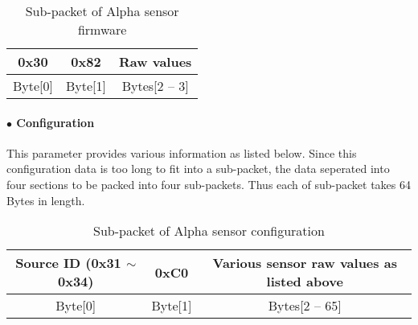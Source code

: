 \begin{table}[h!]
    \centering
    \caption{Sub-packet of Alpha sensor firmware}
    \begin{tabular}{|c|c|c|}
        \hline
        \rowcolor{black!8}
        \textbf{0x30} & \textbf{0x82} & \textbf{Raw values}\\
        \hline
        Byte[0] & Byte[1] & Bytes[2 -- 3] \\ \hline
    \end{tabular}
\end{table}


\paragraph{$\bullet$ Configuration}
This parameter provides various information as listed below.
Since this configuration data is too long to fit into a sub-packet, the data seperated into four sections to be packed into four sub-packets. Thus each of sub-packet takes 64 Bytes in length.


\begin{table}[h!]
    \centering
    \caption{Sub-packet of Alpha sensor configuration}
    \begin{tabular}{|c|c|c|}
        \hline
        \rowcolor{black!8}
        \textbf{Source ID} (0x31 $\sim$ 0x34) & \textbf{0xC0} & \textbf{Various sensor raw values as listed above}\\
        \hline
        Byte[0] & Byte[1] & Bytes[2 -- 65] \\ \hline
    \end{tabular}
\end{table}


